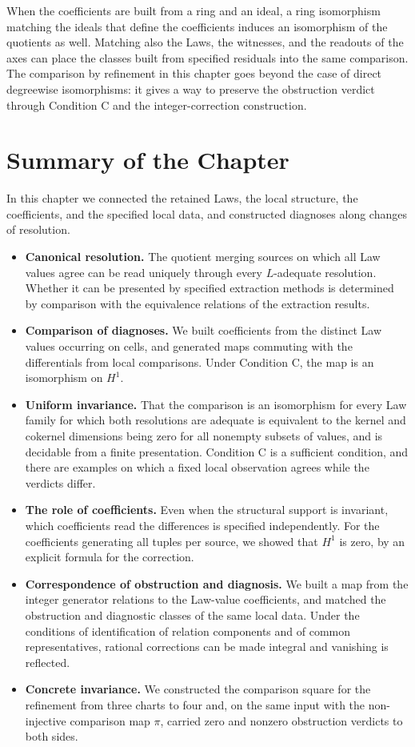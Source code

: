 When the coefficients are built from a ring and an ideal, a ring isomorphism
matching the ideals that define the coefficients induces an isomorphism of the
quotients as well. Matching also the Laws, the witnesses, and the readouts of the
axes can place the classes built from specified residuals into the same comparison.
The comparison by refinement in this chapter goes beyond the case of direct
degreewise isomorphisms: it gives a way to preserve the obstruction verdict through
Condition C and the integer-correction construction.

\section*{Summary of the Chapter}

In this chapter we connected the retained Laws, the local structure, the
coefficients, and the specified local data, and constructed diagnoses along changes
of resolution.

\begin{itemize}
\item \textbf{Canonical resolution.} The quotient merging sources on which all Law
values agree can be read uniquely through every $L$-adequate resolution. Whether it
can be presented by specified extraction methods is determined by comparison with
the equivalence relations of the extraction results.
\item \textbf{Comparison of diagnoses.} We built coefficients from the distinct Law
values occurring on cells, and generated maps commuting with the differentials from
local comparisons. Under Condition C, the map is an isomorphism on $H^1$.
\item \textbf{Uniform invariance.} That the comparison is an isomorphism for every
Law family for which both resolutions are adequate is equivalent to the kernel and
cokernel dimensions being zero for all nonempty subsets of values, and is decidable
from a finite presentation. Condition C is a sufficient condition, and there are
examples on which a fixed local observation agrees while the verdicts differ.
\item \textbf{The role of coefficients.} Even when the structural support is
invariant, which coefficients read the differences is specified independently. For
the coefficients generating all tuples per source, we showed that $H^1$ is zero, by
an explicit formula for the correction.
\item \textbf{Correspondence of obstruction and diagnosis.} We built a map from the
integer generator relations to the Law-value coefficients, and matched the
obstruction and diagnostic classes of the same local data. Under the conditions of
identification of relation components and of common representatives, rational
corrections can be made integral and vanishing is reflected.
\item \textbf{Concrete invariance.} We constructed the comparison square for the
refinement from three charts to four and, on the same input with the non-injective
comparison map $\pi$, carried zero and nonzero obstruction verdicts to both sides.
\end{itemize}

